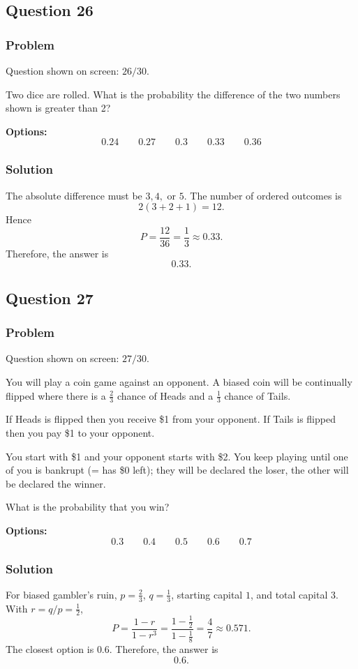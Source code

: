 \documentclass[12pt]{article}
\begin{document}
\subsection{Question 26}
\subsubsection{Problem}
Question shown on screen: \(26/30\).

Two dice are rolled. What is the probability the difference of the two numbers shown is greater than 2?

\noindent\textbf{Options:}
\[
\boxed{0.24}
\qquad
\boxed{0.27}
\qquad
\boxed{0.3}
\qquad
\boxed{0.33}
\qquad
\boxed{0.36}
\]

\subsubsection{Solution}
The absolute difference must be \(3,4,\) or \(5\). The number of ordered outcomes is
\[
2(3+2+1)=12.
\]
Hence
\[
P=\frac{12}{36}=\frac{1}{3}\approx 0.33.
\]
Therefore, the answer is
\[
\boxed{0.33}.
\]

\subsection{Question 27}
\subsubsection{Problem}
Question shown on screen: \(27/30\).

You will play a coin game against an opponent. A biased coin will be continually flipped where there is a \(\frac{2}{3}\) chance of Heads and a \(\frac{1}{3}\) chance of Tails.

If Heads is flipped then you receive \$1 from your opponent. If Tails is flipped then you pay \$1 to your opponent.

You start with \$1 and your opponent starts with \$2. You keep playing until one of you is bankrupt (= has \$0 left); they will be declared the loser, the other will be declared the winner.

What is the probability that you win?

\noindent\textbf{Options:}
\[
\boxed{0.3}
\qquad
\boxed{0.4}
\qquad
\boxed{0.5}
\qquad
\boxed{0.6}
\qquad
\boxed{0.7}
\]

\subsubsection{Solution}
For biased gambler's ruin, \(p=\frac23\), \(q=\frac13\), starting capital \(1\), and total capital \(3\). With \(r=q/p=\frac12\),
\[
P=\frac{1-r}{1-r^3}
=\frac{1-\frac12}{1-\frac18}
=\frac{4}{7}\approx 0.571.
\]
The closest option is \(0.6\). Therefore, the answer is
\[
\boxed{0.6}.
\]
\end{document}
